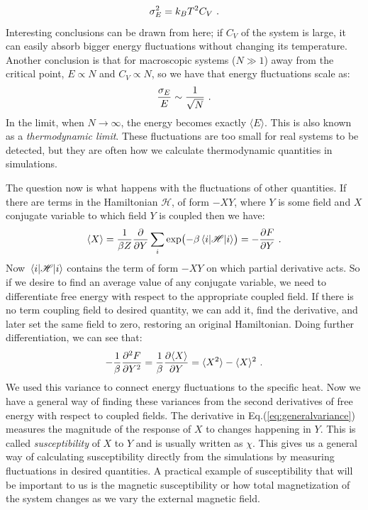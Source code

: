 \begin{equation*}
	\sigma^2_E = k_B T^2 C_V \ .
\end{equation*}
Interesting conclusions can be drawn from here; if $C_V$ of the system is large, it can easily absorb bigger energy fluctuations without changing its temperature. Another conclusion is that for macroscopic systems ($N \gg 1$) away from the critical point, $E \propto N$ and $C_V \propto N$, so we have that energy fluctuations scale as:
\begin{equation}
	\frac{\sigma_E}{E} \sim \frac{1}{\sqrt{N}} \ .
\end{equation}
In the limit, when $N \rightarrow \infty$, the energy becomes exactly $\langle E \rangle$. This is also known as a \textit{thermodynamic limit}. These fluctuations are too small for real systems to be detected, but they are often how we calculate thermodynamic quantities in simulations.
\par
The question now is what happens with the fluctuations of other quantities. If there are terms in the Hamiltonian $\mathcal{H}$, of form $-XY$, where $Y$ is some field and $X$ conjugate variable to which field $Y$ is coupled then we have:
\begin{equation}
	\langle X \rangle = \frac{1}{\beta Z} \pdv{Y} \sum_i \exp(-\beta \mel{i}{\mathcal{H}}{i}) = -\pdv{F}{Y} \ .
\end{equation}
Now $\mel{i}{\mathcal{H}}{i}$ contains the term of form $-XY$ on which partial derivative acts. So if we desire to find an average value of any conjugate variable, we need to differentiate free energy with respect to the appropriate coupled field. If there is no term coupling field to desired quantity, we can add it, find the derivative, and later set the same field to zero, restoring an original Hamiltonian. Doing further differentiation, we can see that:
\begin{equation}
	-\frac{1}{\beta}\pdv[2]{F}{Y} = \frac{1}{\beta} \pdv{\langle X \rangle}{Y} = \langle X^2 \rangle - \langle X \rangle^2 \ .
	\label{eq:generalvariance}
\end{equation}
We used this variance to connect energy fluctuations to the specific heat. Now we have a general way of finding these variances from the second derivatives of free energy with respect to coupled fields. The derivative in Eq.(\ref{eq:generalvariance}) measures the magnitude of the response of $X$ to changes happening in $Y$. This is called \textit{susceptibility} of $X$ to $Y$ and is usually written as $\chi$. This gives us a general way of calculating susceptibility directly from the simulations by measuring fluctuations in desired quantities. A practical example of susceptibility that will be important to us is the magnetic susceptibility or how total magnetization of the system changes as we vary the external magnetic field.
